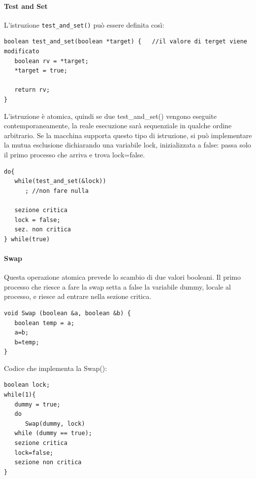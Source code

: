 \documentclass[a4paper]{article}
\begin{document}
\paragraph{Test and Set}
L'istruzione \texttt{test\_and\_set()} può essere definita così:
\begin{verbatim}
boolean test_and_set(boolean *target) {   //il valore di terget viene modificato
   boolean rv = *target;
   *target = true;
   
   return rv;
}
\end{verbatim}
L'istruzione è atomica, quindi se due test\_and\_set() vengono eseguite contemporaneamente, la reale esecuzione sarà sequenziale in qualche ordine arbitrario. Se la macchina supporta questo tipo di istruzione, si può implementare la mutua esclusione dichiarando una variabile lock, inizializzata a false: passa solo il primo processo che arriva e trova lock=false.
\begin{verbatim}
do{
   while(test_and_set(&lock))
      ; //non fare nulla
   
   sezione critica
   lock = false;
   sez. non critica
} while(true)
\end{verbatim}

\paragraph{Swap}
Questa operazione atomica prevede lo scambio di due valori booleani. Il primo processo che riesce a fare la swap setta a false la variabile dummy, locale al processo, e riesce ad entrare nella sezione critica.
\begin{verbatim}
void Swap (boolean &a, boolean &b) {
   boolean temp = a;
   a=b;
   b=temp;
}
\end{verbatim}
Codice che implementa la Swap():
\begin{verbatim}
boolean lock;
while(1){
   dummy = true;
   do
      Swap(dummy, lock)
   while (dummy == true);
   sezione critica
   lock=false;
   sezione non critica
}
\end{verbatim}
\end{document}
